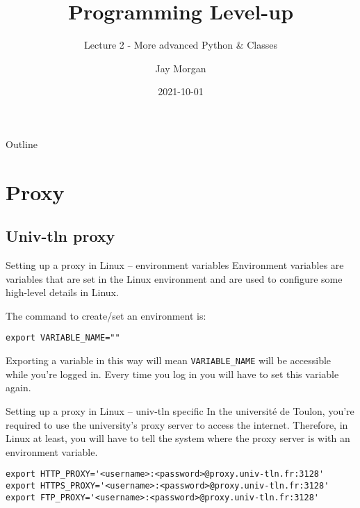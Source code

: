 \documentclass[10pt]{beamer}
\author{Jay Morgan}
\date{2021-10-01}
\title{Programming Level-up}
\subtitle{Lecture 2 - More advanced Python \& Classes}
\begin{document}
\maketitle
\begin{frame}{Outline}
\tableofcontents
\end{frame}


\section{Proxy}
\label{sec:orgd44dba2}

\subsection{Univ-tln proxy}
\label{sec:orgc6bb8ed}

\begin{frame}[label={sec:org9afa632},fragile]{Setting up a proxy in Linux -- environment variables}
 Environment variables are variables that are set in the Linux environment and are
used to configure some high-level details in Linux.

The command to create/set an environment is:

\begin{verbatim}
export VARIABLE_NAME=""
\end{verbatim}

Exporting a variable in this way will mean \texttt{VARIABLE\_NAME} will be accessible while
you're logged in. Every time you log in you will have to set this variable again.
\end{frame}

\begin{frame}[label={sec:org15ba41f},fragile]{Setting up a proxy in Linux -- univ-tln specific}
 In the université de Toulon, you're required to use the university's proxy server to
access the internet. Therefore, in Linux at least, you will have to tell the system
where the proxy server is with an environment variable.

\begin{verbatim}
export HTTP_PROXY='<username>:<password>@proxy.univ-tln.fr:3128'
export HTTPS_PROXY='<username>:<password>@proxy.univ-tln.fr:3128'
export FTP_PROXY='<username>:<password>@proxy.univ-tln.fr:3128'
\end{verbatim}
\end{frame}
\end{document}
